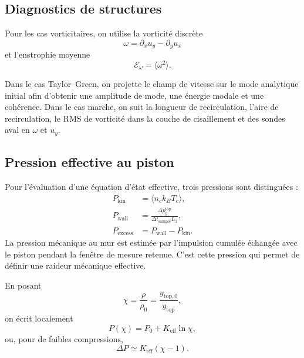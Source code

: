 \documentclass[11pt,a4paper]{article}
\begin{document}
\subsection{Diagnostics de structures}

Pour les cas vorticitaires, on utilise la vorticité discrète
\begin{equation}
  \omega = \partial_x u_y - \partial_y u_x
\end{equation}
et l'enstrophie moyenne
\begin{equation}
  \mathcal{E}_{\omega}=\langle \omega^2\rangle.
\end{equation}

Dans le cas Taylor--Green, on projette le champ de vitesse sur le mode analytique initial afin d'obtenir une amplitude de mode, une énergie modale et une cohérence. Dans le cas marche, on suit la longueur de recirculation, l'aire de recirculation, le RMS de vorticité dans la couche de cisaillement et des sondes aval en $\omega$ et $u_y$.

\subsection{Pression effective au piston}

Pour l'évaluation d'une équation d'état effective, trois pressions sont distinguées :
\begin{align}
  P_{\mathrm{kin}} &= \langle n_c k_B T_c\rangle,\\
  P_{\mathrm{wall}} &= \frac{\Delta p_y^{\mathrm{top}}}{\Delta t_{\mathrm{sample}} L_x},\\
  P_{\mathrm{excess}} &= P_{\mathrm{wall}}-P_{\mathrm{kin}}.
\end{align}
La pression mécanique au mur est estimée par l'impulsion cumulée échangée avec le piston pendant la fenêtre de mesure retenue. C'est cette pression qui permet de définir une raideur mécanique effective.

En posant
\begin{equation}
  \chi=\frac{\rho}{\rho_0}=\frac{y_{\mathrm{top},0}}{y_{\mathrm{top}}},
\end{equation}
on écrit localement
\begin{equation}
  P(\chi)=P_0+K_{\mathrm{eff}}\ln \chi,
\end{equation}
ou, pour de faibles compressions,
\begin{equation}
  \Delta P \simeq K_{\mathrm{eff}}(\chi-1).
\end{equation}
\end{document}
